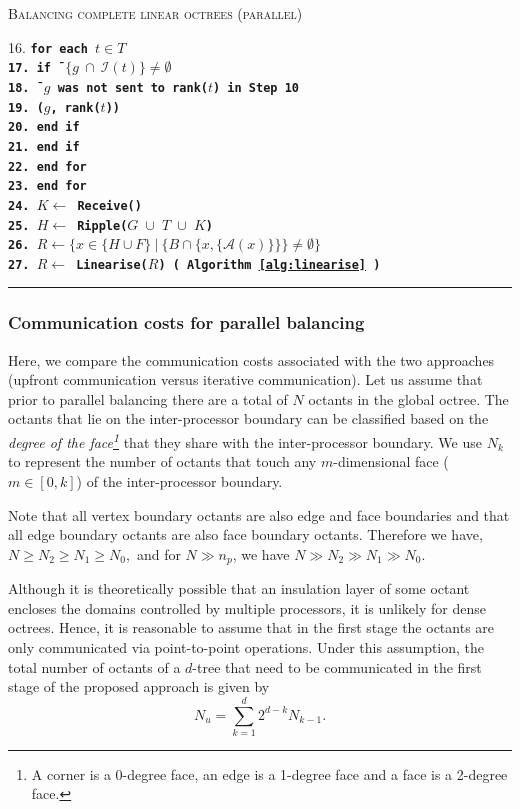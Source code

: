 \begin{table}
\begin{algorithm}{ \textsc{Balancing complete linear octrees (parallel)}}
\begin{tabbing}
16. \> \tt{\bf for} \=\bf{each} {$t \in T$}\\
17. \>\> {\bf if} \= $\{g ~\cap~ \mathcal{I}(t)\} \neq \emptyset$\\
18. \>\> \= $g$ was not sent to rank($t$) in Step 10\\
19.	\>\>\>($g$, rank($t$)) \\
20. \>\>\> {\bf end if}\\
21. \>\> {\bf end if}\\
22. \> \tt{\bf end for}\\
23. \tt{\bf end for}\\
24. $K \leftarrow$ Receive()\\
25. $H \leftarrow$ Ripple($G$ $\cup$ $T$ $\cup$ $K$) \\
26. $R \leftarrow \{x \in \{H \cup F\} ~|~ \{B \cap \{x,\{\mathcal{A}(x)\}\}\} \neq \emptyset \}$\\
27. $R \leftarrow $ Linearise($R$) ( Algorithm \ref{alg:linearise} )
\end{tabbing}
\label{alg:parBal}
\end{algorithm}
\rule{\textwidth}{0.01mm}
\end{table}

\subsubsection{Communication costs for parallel balancing}
\label{sec:commCost}
Here, we compare the communication costs associated with the two
approaches (upfront communication versus iterative communication). Let us assume that prior to
parallel balancing there are a total of $N$ octants in the global octree. The octants that lie on the
inter-processor boundary can be classified based on the {\em{degree of
the face}\footnote{A corner is a 0-degree face, an edge is a
1-degree face and a face is a 2-degree face.}} that they share with the
inter-processor boundary. We use $N_k$ to represent the number of
octants that touch any $m$-dimensional face ($m\in [0,k]$) of the
inter-processor boundary.

Note that all vertex boundary octants are also edge and face
boundaries and that all edge boundary octants are also face boundary
octants. Therefore we have, $N \geq N_2 \geq N_1 \geq N_0,$ and for
$N\gg n_p$, we have $N \gg N_2 \gg N_1 \gg N_0$.

Although it is theoretically possible that an insulation layer of some
octant encloses the domains controlled by multiple processors, it is
unlikely for dense octrees. Hence, it is reasonable to assume that in
the first stage the octants are only communicated via point-to-point
operations. Under this assumption, the total number of octants of a
$d$-tree that need to be communicated in the first stage of the
proposed approach is given by
\begin{equation}
 \label{eq:numComm}
 N_u = \sum_{k=1}^{d} 2^{d-k}N_{k-1}.
\end{equation}

